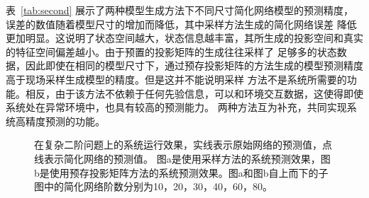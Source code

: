 表~\ref{tab:second} 展示了两种模型生成方法下不同尺寸简化网络模型的预测精度，误差的数值随着模型尺寸的增加而降低，其中采样方法生成的简化网络误差
降低更加明显。这说明了状态空间越大，状态信息越丰富，其所生成的投影空间和真实的特征空间偏差越小。由于预置的投影矩阵的生成往往采样了
足够多的状态数据，因此即使在相同的模型尺寸下，通过预存投影矩阵的方法生成的模型预测精度高于现场采样生成模型的精度。但是这并不能说明采样
方法不是系统所需要的功能。相反，由于该方法不依赖于任何先验信息，可以和环境交互数据，这使得即使系统处在异常环境中，也具有较高的预测能力。
两种方法互为补充，共同实现系统高精度预测的功能。
\begin{figure}
	\centering
	\caption{在复杂二阶问题上的系统运行效果，实线表示原始网络的预测值，点线表示简化网络的预测值。
		图a是使用采样方法的系统预测效果，图b是使用预存投影矩阵方法的系统预测效果。图a和图b自上而下的子图中的简化网络阶数分别为10，20，30，40，60，80。}
	\label{fig:second}
\end{figure}


